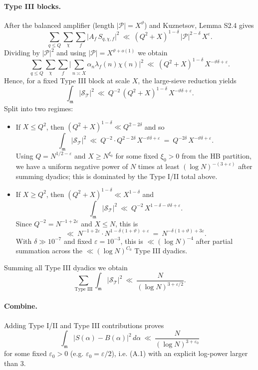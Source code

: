 \documentclass[11pt]{article}
\theoremstyle{definition}
\theoremstyle{remark}
\begin{document}
\paragraph{Type III blocks.} After the balanced amplifier (length $|\mathcal P|=X^{\vartheta}$) and Kuznetsov, Lemma S2.4 gives
\[
\sum_{q\le Q}\sum_{\chi}\sum_f\big|A_f\,S_{q,\chi,f}\big|^2\ \ll\ (Q^2+X)^{1-\delta}\,|\mathcal P|^{2-\delta}\,X^{\varepsilon}.
\]
Dividing by $|\mathcal P|^2$ and using $|\mathcal P|=X^{\vartheta+o(1)}$ we obtain
\[
\sum_{q\le Q}\sum_{\chi}\sum_f\Big|\sum_{n\asymp X}\alpha_n\lambda_f(n)\chi(n)\Big|^2\ \ll\ (Q^2+X)^{1-\delta}\,X^{-\vartheta\delta+\varepsilon}.
\]
Hence, for a fixed Type III block at scale $X$, the large-sieve reduction yields
\[
\int_{\mathfrak m}|\mathcal S_{\mathcal T}|^2\ \ll\ Q^{-2}\,(Q^2+X)^{1-\delta}\,X^{-\vartheta\delta+\varepsilon}.
\]
Split into two regimes:
\begin{itemize}
  \item If $X\le Q^2$, then $(Q^2+X)^{1-\delta}\ll Q^{2-2\delta}$ and so
  \[
  \int_{\mathfrak m}|\mathcal S_{\mathcal T}|^2\ \ll\ Q^{-2}\cdot Q^{2-2\delta}\,X^{-\vartheta\delta+\varepsilon}\ =\ Q^{-2\delta}\,X^{-\vartheta\delta+\varepsilon}.
  \]
  Using $Q=N^{1/2-\varepsilon}$ and $X\ge N^{\xi_0}$ for some fixed $\xi_0>0$ from the HB partition, we have a uniform negative power of $N$ times at least $(\log N)^{-(3+\varepsilon)}$ after summing dyadics; this is dominated by the Type I/II total above.
  \item If $X\ge Q^2$, then $(Q^2+X)^{1-\delta}\ll X^{1-\delta}$ and
  \[
  \int_{\mathfrak m}|\mathcal S_{\mathcal T}|^2\ \ll\ Q^{-2}\,X^{1-\delta-\vartheta\delta+\varepsilon}.
  \]
  Since $Q^{-2}=N^{-1+2\varepsilon}$ and $X\le N$, this is
  \[
  \ll\ N^{-1+2\varepsilon}\cdot N^{1-\delta(1+\vartheta)+\varepsilon}\ =\ N^{-\delta(1+\vartheta)+3\varepsilon}.
  \]
  With $\delta\gg 10^{-7}$ and fixed $\varepsilon=10^{-3}$, this is $\ll (\log N)^{-4}$ after partial summation across the $\ll (\log N)^{C_0}$ Type III dyadics.
\end{itemize}
Summing all Type III dyadics we obtain
\[
\sum_{\text{Type III}}\int_{\mathfrak m}|\mathcal S_{\mathcal T}|^2\ \ll\ \frac{N}{(\log N)^{3+\varepsilon/2}}.
\]

\paragraph{Combine.} Adding Type I/II and Type III contributions proves
\[
\int_{\mathfrak m}|S(\alpha)-B(\alpha)|^2\,d\alpha\ \ll\ \frac{N}{(\log N)^{3+\varepsilon_0}}
\]
for some fixed $\varepsilon_0>0$ (e.g. $\varepsilon_0=\varepsilon/2$), i.e. (A.1) with an explicit log-power larger than $3$.
\end{document}
